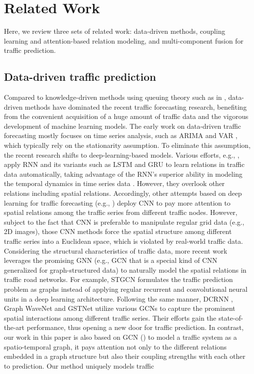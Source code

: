 \section{Related Work}
\label{sec:related_work}
Here, we review three sets of related work: data-driven methods, coupling learning and attention-based relation modeling, and multi-component fusion for traffic prediction.

\subsection{Data-driven traffic prediction}
Compared to knowledge-driven methods using queuing theory such as in \cite{cascetta2013transportation}, data-driven methods have dominated the recent traffic forecasting research, benefiting from the convenient acquisition of a huge amount of traffic data and the vigorous development of machine learning models. The early work on data-driven traffic forecasting mostly focuses on time series analysis, such as ARIMA \cite{williams2003modeling} and VAR \cite{zivot2006vector}, which typically rely on the stationarity assumption. To eliminate this assumption, the recent research shifts to deep-learning-based models. Various efforts, e.g., \cite{zhao2017lstm,ma2015long,bai2020adaptive,pan2020spatio}, apply RNN and its variants such as LSTM \cite{hochreiter1997long} and GRU \cite{cho2014learning} to learn relations in traffic data automatically, taking advantage of the RNN’s superior ability in modeling the temporal dynamics in time series data \cite{connor1994recurrent}. However, they overlook other relations including spatial relations. Accordingly, other attempts based on deep learning for traffic forecasting (e.g., \cite{wu2016short,ma2017learning,zhang2017deep}) deploy CNN to pay more attention to spatial relations among the traffic series from different traffic nodes. However, subject to the fact that CNN is preferable to manipulate regular grid data (e.g., 2D images), those CNN methods force the spatial structure among different traffic series into a Euclidean space, which is violated by real-world traffic data. Considering the structural characteristics of traffic data, more recent work leverages the promising GNN (e.g., GCN \cite{kipf2016semi} that is a special kind of CNN generalized for graph-structured data) to naturally model the spatial relations in traffic road networks. For example, STGCN \cite{yu2017spatio} formulates the traffic prediction problem as graphs instead of applying regular recurrent and convolutional neural units in a deep learning architecture. Following the same manner, DCRNN \cite{li2017diffusion}, Graph WaveNet \cite{wu2019graph} and GSTNet \cite{fang2019gstnet} utilize various GCNs to capture the prominent spatial interactions among different traffic series. Their efforts gain the state-of-the-art performance, thus opening a new door for traffic prediction. In contrast, our work in this paper is also based on GCN (\cite{mengzhang2020spatial, song2020spatial}) to model a traffic system as a spatio-temporal graph, it pays attention not only to the different relations embedded in a graph structure but also their coupling strengths with each other to prediction. Our method uniquely models traffic 